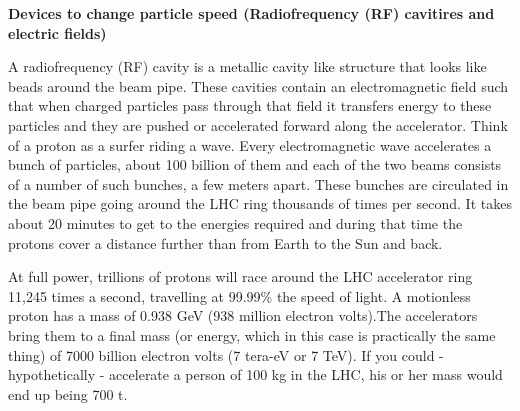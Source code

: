 \noindent
\textbf{Devices to change particle speed (Radiofrequency (RF) cavitires and electric fields)}

\;
\noindent
A radiofrequency (RF) cavity is a metallic cavity like structure that looks like beads around the beam pipe.  These cavities contain an electromagnetic field such that when charged particles pass through that field it transfers energy to these particles and they are pushed or accelerated forward along the accelerator. Think of a proton as a surfer riding a wave.  Every electromagnetic wave accelerates a bunch of particles, about 100 billion of them and each of the two beams consists of a number of such bunches, a few meters apart. These bunches are circulated in the beam pipe going around the LHC ring thousands of times per second. It takes about 20 minutes to get to the energies required and during that time the protons cover a distance further than from Earth to the Sun and back.

\;
\noindent
At full power, trillions of protons will race around the LHC accelerator ring 11,245 times a second, travelling at 99.99\% the speed of light. A motionless proton has a mass of 0.938 GeV (938 million electron volts).The accelerators bring them to a final mass (or energy, which in this case is practically the same thing) of 7000 billion electron volts (7 tera-eV or 7 TeV). If you could - hypothetically - accelerate a person of 100 kg in the LHC, his or her mass would end up being 700 t.